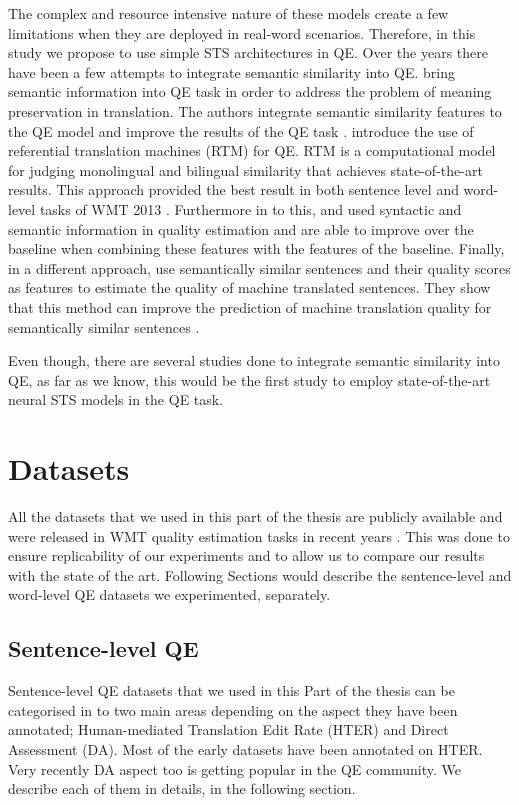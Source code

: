 The complex and resource intensive nature of these models create a few limitations when they are deployed in real-word scenarios. Therefore, in this study we propose to use simple STS architectures in QE. Over the years there have been a few attempts to integrate semantic similarity into QE. \citet{specia2011predicting} bring semantic information into QE task in order to address the problem of meaning preservation in translation. The authors integrate semantic similarity features to the QE model and improve the results of the QE task \cite{specia2011predicting}. \citet{bicici-way-2014-referential} introduce the use of referential translation machines (RTM) for QE. RTM is a computational model for judging monolingual and bilingual similarity that achieves state-of-the-art results. This approach provided the best result in both sentence level and word-level tasks of WMT 2013 \cite{bojar-etal-2013-findings}. Furthermore in to this, \citet{kaljahi-etal-2014-syntax} and \citet{camargo-de-souza-etal-2014-fbk} used syntactic and semantic information in quality estimation and are able to improve over the baseline when combining these features with the features of the baseline. Finally, in a different approach, \citet{bechara-etal-2016-semantic} use semantically similar sentences and their quality scores as features to estimate the quality of machine translated sentences. They show that this method can improve the prediction of machine translation quality for semantically similar sentences \cite{bechara-etal-2016-semantic}. 

Even though, there are several studies done to integrate semantic similarity into QE, as far as we know, this would be the first study to employ state-of-the-art neural STS models in the QE task. 

\section{Datasets}
\label{sec:qe_datasets}

 All the datasets that we used in this part of the thesis are publicly available and were released in WMT quality estimation tasks in recent years \cite{specia-etal-2018-findings,fonseca-etal-2019-findings,specia-etal-2020-findings-wmt}. This was done to ensure replicability of our experiments and to allow us to compare our results with the state of the art. Following Sections would describe the sentence-level and word-level QE datasets we experimented, separately.

\subsection{Sentence-level QE}
Sentence-level QE datasets that we used in this Part of the thesis can be categorised in to two main areas depending on the aspect they have been annotated; Human-mediated Translation Edit Rate (HTER) and Direct Assessment (DA). Most of the early datasets have been annotated on HTER. Very recently DA aspect too is getting popular in the QE community. We describe each of them in details, in the following section.


